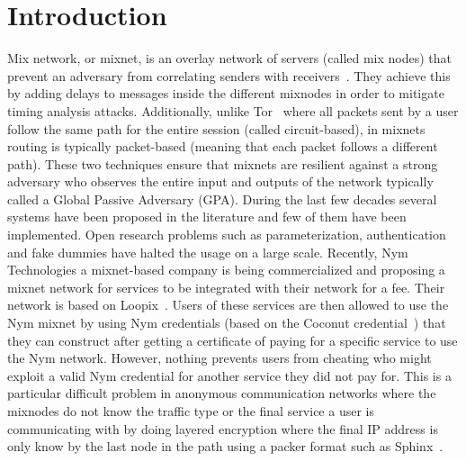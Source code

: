 \section{Introduction}

Mix network, or mixnet, is an overlay network of servers (called mix nodes) that prevent an adversary from correlating senders with receivers~\cite{chaum-mix,cypherpunk-remailer,piotrowska2017loopix,nym-network-whitepaper,danezis2003mixminion, van2015vuvuzela,mixmaster-spec,chaum2016cmix}. They achieve this by adding delays to messages inside the different mixnodes in order to mitigate timing analysis attacks. Additionally, unlike Tor~\cite{onion-routing96} where all packets sent by a user follow the same path for the entire session (called circuit-based), in mixnets routing is typically packet-based (meaning that each packet follows a different path). These two techniques ensure that mixnets are resilient against a strong adversary who observes the entire input and outputs of the network typically called a Global Passive Adversary (GPA).
During the last few decades several systems have been proposed in the literature and few of them have been implemented. Open research problems such as parameterization, authentication and fake dummies have halted the usage on a large scale.
%
%
Recently, Nym Technologies a mixnet-based company is being commercialized
and proposing a mixnet network for services to be integrated with their
network for a fee. Their network is based on
Loopix~\cite{piotrowska2017loopix}. Users of these services are then
allowed to use the Nym mixnet by using Nym credentials (based on the
Coconut credential~\cite{coconut}) that they can construct after getting a
certificate of paying for a specific service to use the Nym network.
However, nothing prevents users from cheating who might exploit a valid Nym
%
%
credential for another service they did not pay for. This is a particular
difficult problem in anonymous communication networks where the mixnodes do
not know the traffic type or the final service a user is communicating with
by doing layered encryption where the final IP address is only know by the
last node in the path using a packer format such as Sphinx~\cite{sphinx}. 

